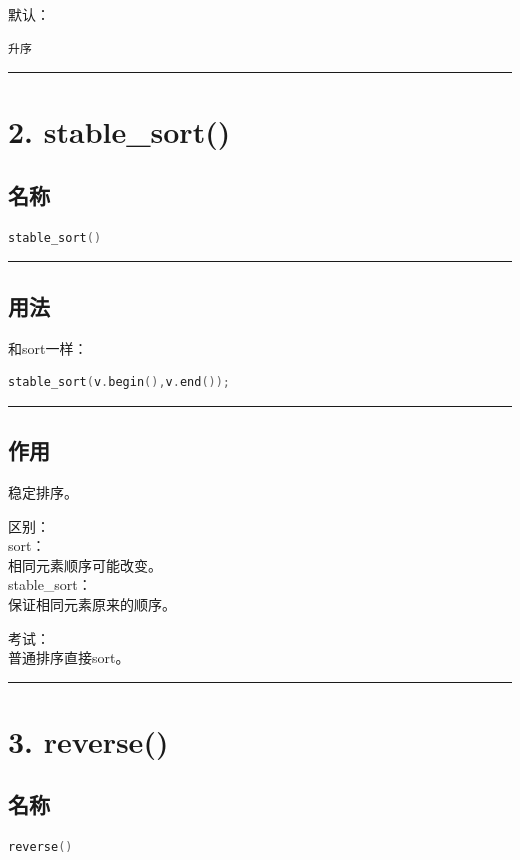 \documentclass[10pt,twocolumn]{extarticle}
\begin{document}
默认：
\begin{lstlisting}
升序
\end{lstlisting}

\noindent\rule{\linewidth}{0.4pt}

\section{2. stable\_sort()}

\subsection{名称}
\begin{lstlisting}[language=C++]
stable_sort()
\end{lstlisting}

\noindent\rule{\linewidth}{0.4pt}

\subsection{用法}
和sort一样：
\begin{lstlisting}[language=C++]
stable_sort(v.begin(),v.end());
\end{lstlisting}

\noindent\rule{\linewidth}{0.4pt}

\subsection{作用}
稳定排序。

区别：\\
sort：\\
相同元素顺序可能改变。\\
stable\_sort：\\
保证相同元素原来的顺序。

考试：\\
普通排序直接sort。

\noindent\rule{\linewidth}{0.4pt}

\section{3. reverse()}

\subsection{名称}
\begin{lstlisting}[language=C++]
reverse()
\end{lstlisting}
\end{document}
